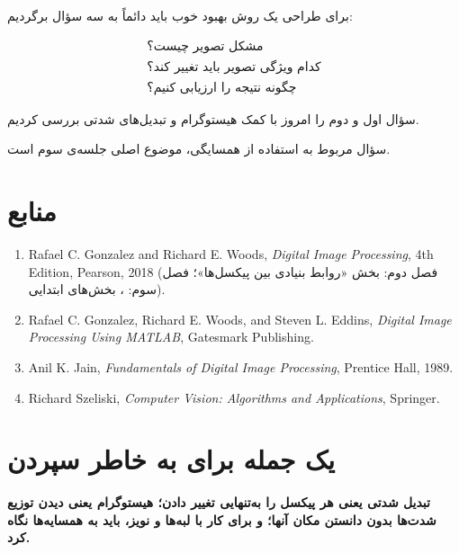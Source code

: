 \documentclass[11pt,a4paper]{article}
\begin{document}
	برای طراحی یک روش بهبود خوب باید دائماً به سه سؤال برگردیم:
	
	\[
	\boxed{
		\begin{array}{c}
			\text{مشکل تصویر چیست؟}\\
			\text{کدام ویژگی تصویر باید تغییر کند؟}\\
			\text{چگونه نتیجه را ارزیابی کنیم؟}
		\end{array}
	}
	\]
	
	سؤال اول و دوم را امروز با کمک هیستوگرام و تبدیل‌های شدتی بررسی کردیم.
	
	سؤال مربوط به استفاده از همسایگی، موضوع اصلی جلسه‌ی سوم است.
	
	
	\section{منابع}
	
	\begin{enumerate}
		
		\item
		Rafael C. Gonzalez and Richard E. Woods,
		\textit{Digital Image Processing},
		4th Edition, Pearson, 2018
		(فصل دوم: بخش «روابط بنیادی بین پیکسل‌ها»؛
		فصل سوم: ، بخش‌های ابتدایی).
		
		\item
		Rafael C. Gonzalez, Richard E. Woods, and Steven L. Eddins,
		\textit{Digital Image Processing Using MATLAB},
		Gatesmark Publishing.
		
		\item
		Anil K. Jain,
		\textit{Fundamentals of Digital Image Processing},
		Prentice Hall, 1989.
		
		\item
		Richard Szeliski,
		\textit{Computer Vision: Algorithms and Applications},
		Springer.
		
	\end{enumerate}
	
	
	\section*{یک جمله برای به خاطر سپردن}
	
	\begin{center}
		\Large
		\textbf{
			تبدیل شدتی یعنی هر پیکسل را به‌تنهایی تغییر دادن؛
			هیستوگرام یعنی دیدن توزیع شدت‌ها بدون دانستن مکان آنها؛
			و برای کار با لبه‌ها و نویز، باید به همسایه‌ها نگاه کرد.
		}
	\end{center}
	
\end{document}
